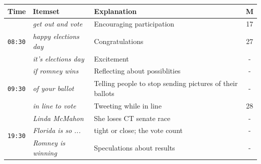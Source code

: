 \documentclass{sig-alternate}
\begin{document}


\begin{table}

\begin{center}
\footnotesize
\def\arraystretch{1.2}
\begin{tabular}{|p{0.7cm}|p{2.5cm}|p{4cm}|c|}
\hline
\textbf{Time} & \textbf{Itemset} & \textbf{Explanation} & \textbf{M} \\ \hline
\multirow{3}{*}{\texttt{08:30}}
& \em get out and vote & Encouraging participation & 17 \\ \cline{2-4}
& \em \scriptsize happy elections day & Congratulations & 27 \\ \cline{2 - 4}
& \em it's elections day & Excitement  & - \\ \hline

\multirow{3}{*}{\texttt{09:30}}
& \em if romney wins & Reflecting about possiblities & - \\ \cline{2 - 4} %
& \em of your ballot & Telling people to stop sending pictures of their ballots & - \\ \cline{2-4}
& \em in line to vote & Tweeting while in line  & 28 \\ \hline


\multirow{3}{*}{\texttt{19:30}}
& \em Linda  McMahon		&  She loses CT senate race & - \\ \cline{2 - 4}
& \em Florida is so ... & tight or close; the vote count  & - \\ \cline{2-4}
& \em \small Romney is winning & Speculations about results  & - \\ \hline %



\end{tabular}
\end{center}
\end{table}
\end{document}
